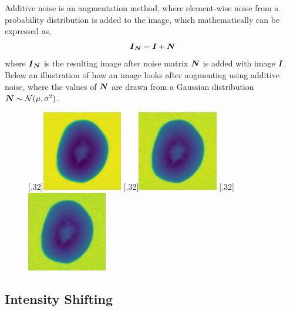 \documentclass[11pt]{article}
\begin{document}
Additive noise is an augmentation method, where element-wise noise from a probability distribution is added to the image, which mathematically can be expressed as,
\begin{equation}
    \boldsymbol{I}_{\boldsymbol{N}} = \boldsymbol{I} + \boldsymbol{N}
\end{equation}
where $\boldsymbol{I}_{\boldsymbol{N}}$ is the resulting image after noise matrix $\boldsymbol{N}$ is added with image $\boldsymbol{I}$. Below an illustration of how an image looks after augmenting using additive noise, where the values of $\boldsymbol{N}$ are drawn from a Gaussian distribution $\boldsymbol{N} \sim \mathcal{N}(\mu, \sigma^{2})$.

\begin{figure}[H]
\centering
{}
  [.32\textwidth]{\includegraphics[height=3.5cm]{figurer/hollow_15.jpg}}
  [.32\textwidth]{\includegraphics[height=3.5cm]{figurer/data_augmentation/hollow_15_noise0.jpg}}
  [.32\textwidth]{\includegraphics[height=3.5cm]{figurer/data_augmentation/hollow_15_noise1.jpg}}
\end{figure}



\subsection{Intensity Shifting}
\end{document}
